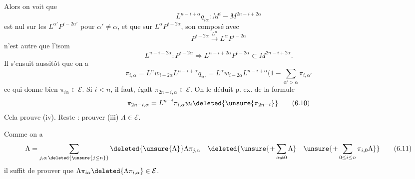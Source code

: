 Alors on voit que
\[
L^{n-i+\alpha}q_{i\alpha}:M^i-M^{2n-i+2\alpha}
\]
est nul sur les $L^{\alpha'}P^{i-2\alpha'}$ pour $\alpha'\neq\alpha$, et que sur $L^\alpha P^{i-2\alpha}$,  son composé avec
\[
P^{i-2\alpha}\xrightarrow{L^\alpha}L^\alpha P^{i-2\alpha}
\]
n'est autre que l'isom
\[
L^{n-i-2\alpha}:P^{i-2\alpha}\Rightarrow L^{n-i+2\alpha}P^{i-2\alpha}\subset M^{2n-i+2\alpha}.
\]
Il s'ensuit aussitôt que on a
\[
\pi_{i,\alpha}=L^\alpha w_{i-2\alpha}L^{n-i+\alpha}q_{i\alpha}=L^\alpha w_{i-2\alpha}L^{n-i+\alpha}(1-\sum_{\alpha'>\alpha}\pi_{i,\alpha'}
\tag{6.9}
\]
ce qui donne bien $\pi_{i\alpha}\in\mathcal E$. 
Si $i<n$, il faut, égalt $\pi_{2n-i,\alpha}\in\mathcal E$. On
le déduit p. ex. de la formule
\[
\pi_{2n-i,\alpha}=L^{n-i}\pi_{i,\alpha}w_i\deleted{\unsure{\pi_{2n-i}}}
\tag{6.10}
\]
Cela prouve  (iv). Reste : prouver (iii) $\Lambda\in\mathcal E$.

Comme on a
\[
\Lambda=\sum_{j,\alpha\,\deleted{\unsure{j\leq n}}}\deleted{\unsure{\Lambda}}\Lambda\pi_{j,\alpha}\quad\deleted{\unsure{+\sum_{\alpha\neq0}\Lambda}\quad\unsure{+\sum_{0\leq i\leq n}\pi_{i,0}\Lambda}}
\tag{6.11}
\]
il suffit de prouver que $\Lambda\pi_{i\alpha}\deleted{\Lambda\pi_{i,\alpha}}\in\mathcal E$.
